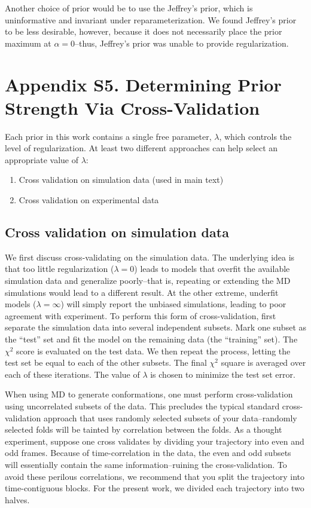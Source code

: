 \documentclass[12pt]{article}
\begin{document}
Another choice of prior would be to use the Jeffrey's prior, which is uninformative and invariant under reparameterization.  We found Jeffrey's prior to be less desirable, however, because it does not necessarily place the prior maximum at $\alpha = 0$--thus, Jeffrey's prior was unable to provide regularization. 

\newpage

\section*{Appendix S5.  Determining Prior Strength Via Cross-Validation}

Each prior in this work contains a single free parameter, $\lambda$, which controls the level of regularization.  At least two different approaches can help select an appropriate value of $\lambda$:

\begin{enumerate}
 \item Cross validation on simulation data (used in main text)
 \item Cross validation on experimental data
\end{enumerate}

\subsection*{Cross validation on simulation data}

We first discuss cross-validating on the simulation data.  The underlying idea is that too little regularization ($\lambda = 0$) leads to models that overfit the available simulation data and generalize poorly--that is, repeating or extending the MD simulations would lead to a different result.  At the other extreme, underfit models ($\lambda = \infty$) will simply report the unbiased simulations, leading to poor agreement with experiment.  To perform this form of cross-validation, first separate the simulation data into several independent subsets.  Mark one subset as the ``test'' set and fit the model on the remaining data (the ``training'' set).  The $\chi^2$ score is evaluated on the test data.  We then repeat the process, letting the test set be equal to each of the other subsets.  The final $\chi^2$ square is averaged over each of these iterations.  The value of $\lambda$ is chosen to minimize the test set error.

When using MD to generate conformations, one must perform cross-validation using uncorrelated subsets of the data.  This precludes the typical standard cross-validation approach that uses randomly selected subsets of your data--randomly selected folds will be tainted by correlation between the folds.  As a thought experiment, suppose one cross validates by dividing your trajectory into even and odd frames.  Because of time-correlation in the data, the even and odd subsets will essentially contain the same information--ruining the cross-validation.  To avoid these perilous correlations, we recommend that you split the trajectory into time-contiguous blocks.  For the present work, we divided each trajectory into two halves.  
\end{document}
